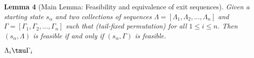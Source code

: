 



{\hspace{-0.3cm}\textbf{Lemma 4} (Main Lemma: Feasibility and equivalence of exit sequences).
\emph
{Given a starting state $s_\alpha$ and two collections of sequences $\Lambda=[\Lambda_1,\Lambda_2,...,\Lambda_n]$ and $\Gamma=[\Gamma_1,\Gamma_2,...,\Gamma_n]$
such that (tail-fixed permutation) for all $1\leq i\leq n$. Then $(s_\alpha, \Lambda)$ is feasible if and only if $(s_\alpha, \Gamma)$ is feasible.}
}

$\Lambda_i \tmu \Gamma_i$ 






